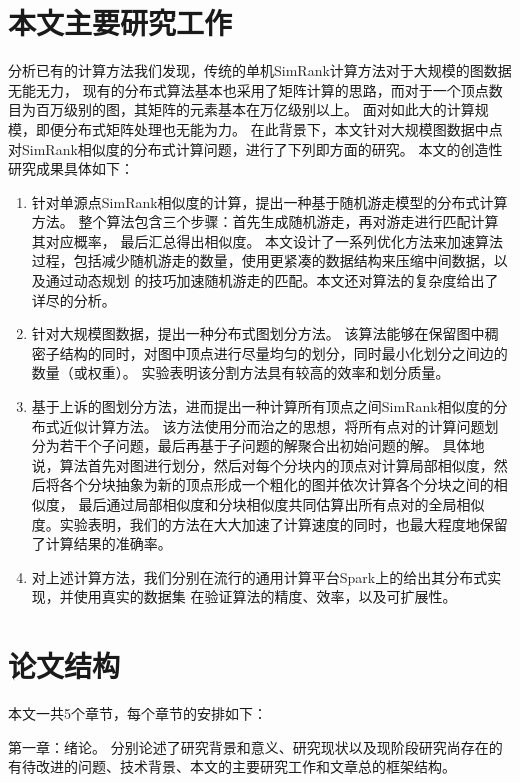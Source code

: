 \documentclass[master]{njuthesis}
\begin{document}
\section{本文主要研究工作}
分析已有的计算方法我们发现，传统的单机SimRank计算方法对于大规模的图数据无能无力，
现有的分布式算法基本也采用了矩阵计算的思路，而对于一个顶点数目为百万级别的图，其矩阵的元素基本在万亿级别以上。
面对如此大的计算规模，即便分布式矩阵处理也无能为力。
在此背景下，本文针对大规模图数据中点对SimRank相似度的分布式计算问题，进行了下列即方面的研究。
本文的创造性研究成果具体如下：
\begin{enumerate}
\item 针对单源点SimRank相似度的计算，提出一种基于随机游走模型的分布式计算方法。
整个算法包含三个步骤：首先生成随机游走，再对游走进行匹配计算其对应概率，
最后汇总得出相似度。
本文设计了一系列优化方法来加速算法过程，包括减少随机游走的数量，使用更紧凑的数据结构来压缩中间数据，以及通过动态规划
的技巧加速随机游走的匹配。本文还对算法的复杂度给出了详尽的分析。

\item 针对大规模图数据，提出一种分布式图划分方法。
该算法能够在保留图中稠密子结构的同时，对图中顶点进行尽量均匀的划分，同时最小化划分之间边的数量（或权重）。
实验表明该分割方法具有较高的效率和划分质量。

\item 基于上诉的图划分方法，进而提出一种计算所有顶点之间SimRank相似度的分布式近似计算方法。
该方法使用分而治之的思想，将所有点对的计算问题划分为若干个子问题，最后再基于子问题的解聚合出初始问题的解。
具体地说，算法首先对图进行划分，然后对每个分块内的顶点对计算局部相似度，然后将各个分块抽象为新的顶点形成一个粗化的图并依次计算各个分块之间的相似度，
最后通过局部相似度和分块相似度共同估算出所有点对的全局相似度。实验表明，我们的方法在大大加速了计算速度的同时，也最大程度地保留了计算结果的准确率。

\item 对上述计算方法，我们分别在流行的通用计算平台Spark上的给出其分布式实现，并使用真实的数据集
在验证算法的精度、效率，以及可扩展性。

\end{enumerate}
\section{论文结构}
本文一共5个章节，每个章节的安排如下：

第一章：绪论。 分别论述了研究背景和意义、研究现状以及现阶段研究尚存在的有待改进的问题、技术背景、本文的主要研究工作和文章总的框架结构。
\end{document}

